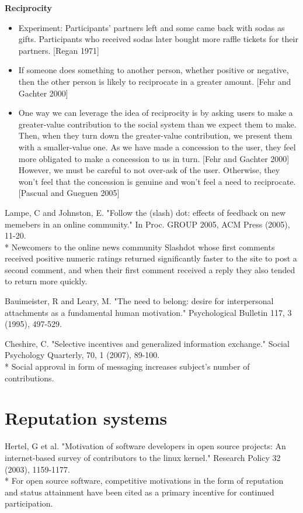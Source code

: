 \documentclass[class=book, crop=false]{standalone}
\providecommand{\keyterm}[1]{\textbf{#1}\marginnote{\scriptsize \textbf{#1}}}
\begin{document}
\keyterm{Reciprocity}
\begin{itemize}
    \item Experiment: Participants’ partners left and some came back with sodas as gifts. Participants who received sodas later bought more raffle tickets for their partners. [Regan 1971]
    \item If someone does something to another person, whether positive or negative, then the other person is likely to reciprocate in a greater amount. [Fehr and Gachter 2000]
    \item One way we can leverage the idea of reciprocity is by asking users to make a greater-value contribution to the social system than we expect them to make. Then, when they turn down the greater-value contribution, we present them with a smaller-value one. As we have made a concession to the user, they feel more obligated to make a concession to us in turn. [Fehr and Gachter 2000] However, we must be careful to not over-ask of the user. Otherwise, they won't feel that the concession is genuine and won't feel a need to reciprocate. [Pascual and Gueguen 2005]
\end{itemize}

Lampe, C and Johnston, E. "Follow the (slash) dot: effects of feedback on new memebers in an online community." In Proc. GROUP 2005, ACM Press (2005), 11-20.\\
 * Newcomers to the online news community Slashdot whose first comments received positive numeric ratings returned significantly faster to the site to post a second comment, and when their first comment received a reply they also tended to return more quickly.

Bauimeister, R and Leary, M. "The need to belong: desire for interpersonal attachments as a fundamental human motivation." Psychological Bulletin 117, 3 (1995), 497-529.

Cheshire, C. "Selective incentives and generalized information exchange." Social Psychology Quarterly, 70, 1 (2007), 89-100.\\
 * Social approval in form of messaging increases subject's number of contributions.

\section{Reputation systems}

Hertel, G et al. "Motivation of software developers in open source projects: An internet-based survey of contributors to the linux kernel." Research Policy 32 (2003), 1159-1177.\\
 * For open source software, competitive motivations in the form of reputation and status attainment have been cited as a primary incentive for continued participation.
\end{document}
